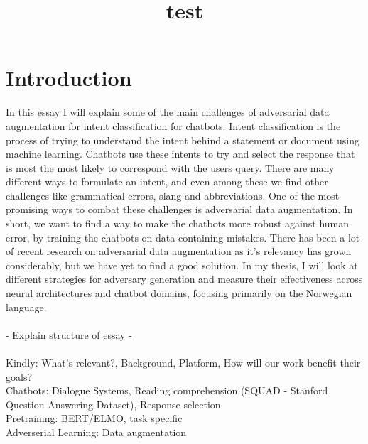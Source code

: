 \documentclass{report}
\begin{document}
\title{test}
\duoforside[author={Adrian Eriksen}, dept={Department of Informatics}, program={Language Technology}]

\setcounter{secnumdepth}{0}

\section{Introduction}
In this essay I will explain some of the main challenges of adversarial data augmentation for intent classification for chatbots.
Intent classification is the process of trying to understand the intent behind a statement or document using machine learning. Chatbots use these intents to try and select the response that is most the most likely to correspond with the users query.
There are many different ways to formulate an intent, and even among these we find other challenges like grammatical errors, slang and abbreviations. One of the most promising ways to combat these challenges is adversarial data augmentation. In short, we want to find a way to make the chatbots more robust against human error, by training the chatbots on data containing mistakes. There has been a lot of recent research on adversarial data augmentation as it's relevancy has grown considerably, but we have yet to find a good solution. In my thesis, I will look at different strategies for adversary generation and measure their effectiveness across neural architectures and chatbot domains, focusing primarily on the Norwegian language.
\\\\  - Explain structure of essay - \\\\
Kindly: What's relevant?, Background, Platform, How will our work benefit their goals?\\
Chatbots: Dialogue Systems, Reading comprehension (SQUAD - Stanford Question Answering Dataset), Response selection \\
Pretraining: BERT/ELMO, task specific\\
Adverserial Learning: Data augmentation


\newpage
\end{document}
